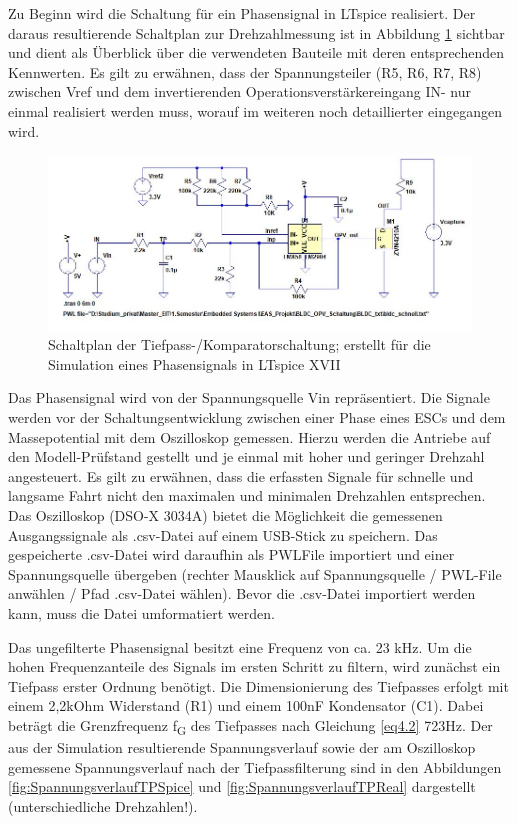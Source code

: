 Zu Beginn wird die Schaltung für ein Phasensignal in LTspice realisiert. Der daraus resultierende Schaltplan zur Drehzahlmessung ist in Abbildung \ref{fig:Schaltungsaufbau} sichtbar und dient als Überblick über die verwendeten Bauteile mit deren entsprechenden Kennwerten. Es gilt zu erwähnen, dass der Spannungsteiler (R5, R6, R7, R8) zwischen Vref und dem invertierenden Operationsverstärkereingang IN- nur einmal realisiert werden muss, worauf im weiteren noch detaillierter eingegangen wird.

\begin{figure}[H] %
\includegraphics[width=.95\textwidth]{sec4/images/Schaltungsaufbau} 
\centering
\captionsetup{width=.95\textwidth}
\caption[Schaltplan der Tiefpass-/Komparatorschaltung aus LTspice XVII]{Schaltplan der Tiefpass-/Komparatorschaltung; erstellt für die Simulation eines Phasensignals in LTspice XVII}\centering
\label{fig:Schaltungsaufbau}
\end{figure}

Das Phasensignal wird von der Spannungsquelle Vin repräsentiert. Die Signale werden vor der Schaltungsentwicklung zwischen einer Phase eines ESCs und dem Massepotential mit dem Oszilloskop gemessen. Hierzu werden die Antriebe auf den Modell-Prüfstand gestellt und je einmal mit hoher und geringer Drehzahl angesteuert. Es gilt zu erwähnen, dass die erfassten Signale für schnelle und langsame Fahrt nicht den maximalen und minimalen Drehzahlen entsprechen. Das Oszilloskop (DSO-X 3034A) bietet die Möglichkeit die gemessenen Ausgangssignale als .csv-Datei auf einem USB-Stick zu speichern. Das gespeicherte .csv-Datei wird daraufhin als \ac{PWLFile} importiert und einer Spannungsquelle übergeben (rechter Mausklick auf Spannungsquelle / PWL-File anwählen / Pfad .csv-Datei wählen). Bevor die .csv-Datei importiert werden kann, muss die Datei umformatiert werden.\vspace{11pt}

Das ungefilterte Phasensignal besitzt eine Frequenz von ca. 23 kHz. Um die hohen Frequenzanteile des Signals im ersten Schritt zu filtern, wird zunächst ein Tiefpass erster Ordnung benötigt. Die Dimensionierung des Tiefpasses erfolgt mit einem 2,2kOhm Widerstand (R1) und einem 100nF Kondensator (C1). Dabei beträgt die Grenzfrequenz f\textsubscript{G} des Tiefpasses nach Gleichung \ref{eq4.2} 723Hz. Der aus der Simulation resultierende Spannungsverlauf sowie der am Oszilloskop gemessene Spannungsverlauf nach der Tiefpassfilterung sind in den Abbildungen \ref{fig:SpannungsverlaufTPSpice} und \ref{fig:SpannungsverlaufTPReal} dargestellt (unterschiedliche Drehzahlen!).

